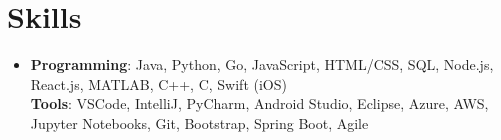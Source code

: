 \documentclass[letterpaper,11pt]{article}
\begin{document}
\section*{Skills}
\begin{itemize}[leftmargin=0.15in, label={}]
\item{
    \textbf{Programming}: Java, Python, Go, JavaScript, HTML/CSS, SQL, Node.js, React.js, MATLAB, C++, C, Swift (iOS) \\
    \textbf{Tools}: VSCode, IntelliJ, PyCharm, Android Studio, Eclipse, Azure, AWS, Jupyter Notebooks, Git, Bootstrap, Spring Boot, Agile
}
\end{itemize}
\end{document}
